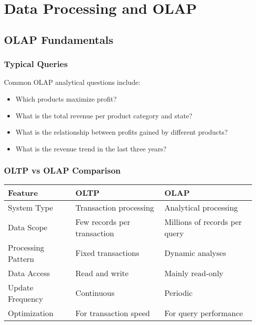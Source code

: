 \chapter{Data Processing and OLAP}

\section{OLAP Fundamentals}

\subsection{Typical Queries}
Common OLAP analytical questions include:
\begin{itemize}
    \item Which products maximize profit?
    \item What is the total revenue per product category and state?
    \item What is the relationship between profits gained by different products?
    \item What is the revenue trend in the last three years?
\end{itemize}

\subsection{OLTP vs OLAP Comparison}
\begin{center}
\begin{tabular}{|p{3.5cm}|p{5cm}|p{5cm}|}
    \hline
    \textbf{Feature} & \textbf{OLTP} & \textbf{OLAP} \\
    \hline
    System Type & Transaction processing & Analytical processing \\
    \hline
    Data Scope & Few records per transaction & Millions of records per query \\
    \hline
    Processing Pattern & Fixed transactions & Dynamic analyses \\
    \hline
    Data Access & Read and write & Mainly read-only \\
    \hline
    Update Frequency & Continuous & Periodic \\
    \hline
    Optimization & For transaction speed & For query performance \\
    \hline
\end{tabular}
\end{center}

